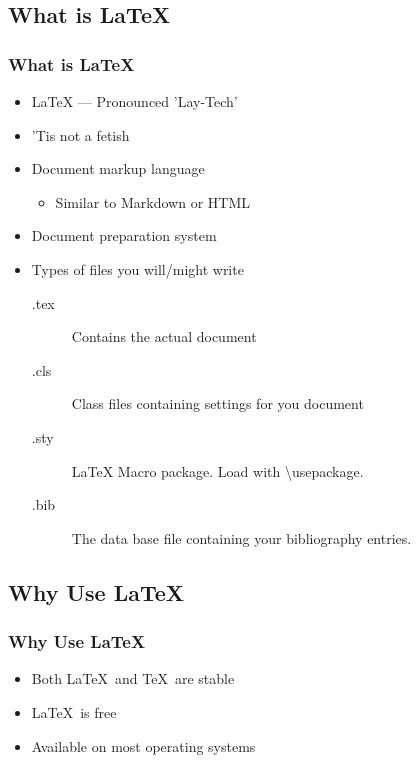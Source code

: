 \subsection{What is \LaTeX}

\begin{frame}[allowframebreaks=0.8]
\frametitle{What is \LaTeX}
    \begin{itemize}
        \item \LaTeX{} --- Pronounced 'Lay-Tech'
        \item 'Tis not a fetish
        \item Document markup language
        \begin{itemize}
            \item Similar to Markdown or HTML
        \end{itemize}
        \item Document preparation system
        \framebreak
        \item Types of files you will/might write
        \begin{description}
          \item[.tex] Contains the actual document
          \item[.cls] Class files containing settings for you document 
          \item[.sty] LaTeX Macro package. Load with 
                      \textbackslash usepackage.
          \item[.bib] The data base file containing your bibliography 
                      entries.
        \end{description}
    \end{itemize}
\end{frame}

\subsection{Why Use \LaTeX{}}

\begin{frame}
\frametitle{Why Use \LaTeX{}}
    \begin{itemize}
        \item Both \LaTeX\ and \TeX\ are stable
        \item \LaTeX\ is free
        \item Available on most operating systems
    \end{itemize}
\end{frame}



